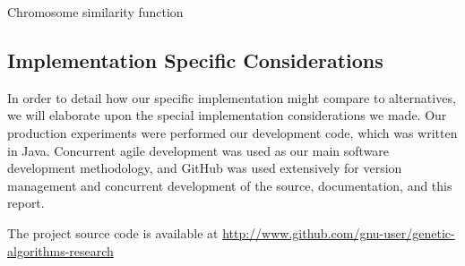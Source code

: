 \documentclass[conference]{IEEEtran}
\begin{document}
\begin{algorithm}
  \SetAlgoLined
  \DontPrintSemicolon
  
\caption{Chromosome similarity function}
\label{alg:similarity}
\end{algorithm}

\subsection{Implementation Specific Considerations}
In order to detail how our specific implementation might compare to alternatives, we will elaborate upon the special implementation considerations we made. Our production experiments were performed our development code, which was written in Java. Concurrent agile development was used as our main software development methodology, and GitHub was used extensively for version management and concurrent development of the source, documentation, and this report. 

The project source code is available at \url{http://www.github.com/gnu-user/genetic-algorithms-research}
\end{document}
